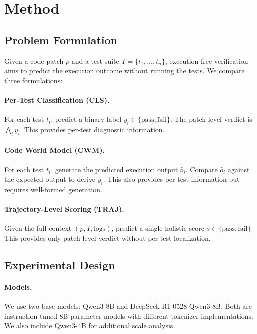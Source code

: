 \documentclass[11pt,a4paper]{article}
\begin{document}
\section{Method}

\subsection{Problem Formulation}

Given a code patch $p$ and a test suite $T = \{t_1, \ldots, t_n\}$, execution-free verification aims to predict the execution outcome without running the tests. We compare three formulations:

\paragraph{Per-Test Classification (CLS).} For each test $t_i$, predict a binary label $y_i \in \{\text{pass}, \text{fail}\}$. The patch-level verdict is $\bigwedge_i y_i$. This provides per-test diagnostic information.

\paragraph{Code World Model (CWM).} For each test $t_i$, generate the predicted execution output $\hat{o}_i$. Compare $\hat{o}_i$ against the expected output to derive $y_i$. This also provides per-test information but requires well-formed generation.

\paragraph{Trajectory-Level Scoring (TRAJ).} Given the full context $(p, T, \text{logs})$, predict a single holistic score $s \in \{\text{pass}, \text{fail}\}$. This provides only patch-level verdict without per-test localization.

\subsection{Experimental Design}

\paragraph{Models.} We use two base models: Qwen3-8B and DeepSeek-R1-0528-Qwen3-8B. Both are instruction-tuned 8B-parameter models with different tokenizer implementations. We also include Qwen3-4B for additional scale analysis.
\end{document}
